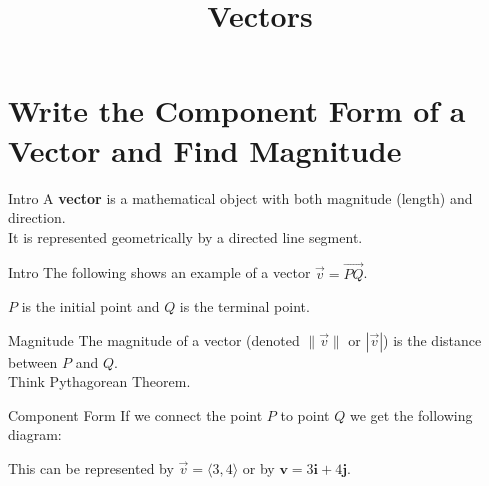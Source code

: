 \documentclass[t,usenames,dvipsnames]{beamer}
\title{Vectors}
\author{}
\date{}
\begin{document}
\begin{frame}
    \titlepage
\end{frame}

\section{Write the Component Form of a Vector and Find Magnitude}

\begin{frame}{Intro}
A {\color{blue}\textbf{vector}} is a mathematical object with both magnitude (length) and direction. \newline\\

It is represented geometrically by a directed line segment.
\end{frame}

\begin{frame}{Intro}
The following shows an example of a vector $\vec{v} = \overrightarrow{PQ}$.   

\begin{center}
\end{center}

$P$ is the \alert{initial point} and $Q$ is the \alert{terminal point}.
\end{frame}

\begin{frame}{Magnitude}
The \alert{magnitude} of a vector (denoted $\lVert \vec{v} \rVert$ or $|\vec{v}|$) is the distance between $P$ and $Q$.    \newline\\

Think Pythagorean Theorem.
\end{frame}

\begin{frame}{Component Form}
    If we connect the point $P$ to point $Q$ we get the following diagram:
\begin{center}
\end{center}
\pause
This can be represented by $\vec{v} = \langle 3, 4 \rangle$ or by $\mathbf{v} = 3\mathbf{i} + 4\mathbf{j}$.
\end{frame}
\end{document}
